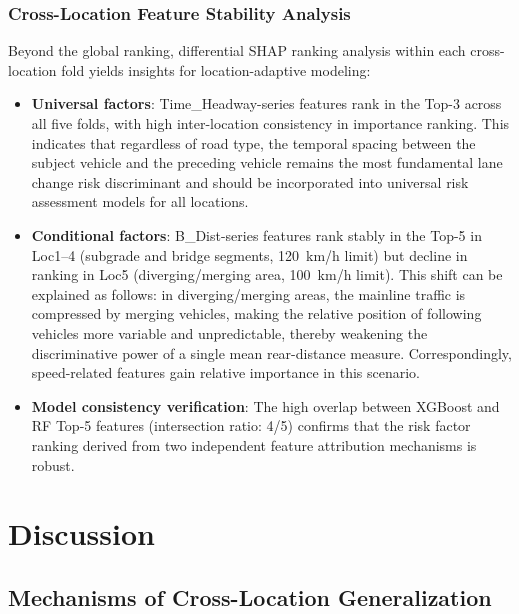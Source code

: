\documentclass[preprint,review,12pt,a4paper]{elsarticle}
\begin{document}
\subsubsection{Cross-Location Feature Stability Analysis}

Beyond the global ranking, differential SHAP ranking analysis within each cross-location fold yields insights for location-adaptive modeling:

\begin{itemize}
  \item \textbf{Universal factors}: Time\_Headway-series features rank in the Top-3 across all five folds, with high inter-location consistency in importance ranking. This indicates that regardless of road type, the temporal spacing between the subject vehicle and the preceding vehicle remains the most fundamental lane change risk discriminant and should be incorporated into universal risk assessment models for all locations.

  \item \textbf{Conditional factors}: B\_Dist-series features rank stably in the Top-5 in Loc1--4 (subgrade and bridge segments, 120~km/h limit) but decline in ranking in Loc5 (diverging/merging area, 100~km/h limit). This shift can be explained as follows: in diverging/merging areas, the mainline traffic is compressed by merging vehicles, making the relative position of following vehicles more variable and unpredictable, thereby weakening the discriminative power of a single mean rear-distance measure. Correspondingly, speed-related features gain relative importance in this scenario.

  \item \textbf{Model consistency verification}: The high overlap between XGBoost and RF Top-5 features (intersection ratio: 4/5) confirms that the risk factor ranking derived from two independent feature attribution mechanisms is robust.
\end{itemize}

\section{Discussion}

\subsection{Mechanisms of Cross-Location Generalization}
\end{document}
